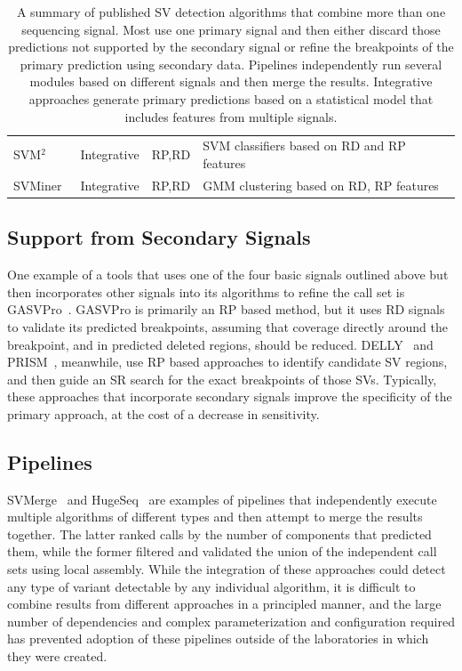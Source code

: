 \begin{table}
\begin{center}
{\begin{tabular}{llll}
SVM$^2$~\cite{Chiara:2012ey}    &       Integrative     &       RP,RD   &       SVM classifiers based on RD and RP features \\
SVMiner~\cite{Hayes:2012ia}	&	Integrative	&	RP,RD	&	GMM clustering based on RD, RP features	\\
\hline
\end{tabular}
}
\end{center}
\caption[A summary of published SV detection algorithms that combine more than one sequencing signal.]{A summary of published SV detection algorithms that combine more than one sequencing signal. Most use one primary signal and then either discard those predictions not supported by the secondary signal or refine the breakpoints of the primary prediction using secondary data. Pipelines independently run several modules based on different signals and then merge the results. Integrative approaches generate primary predictions based on a statistical model that includes features from multiple signals.}
\label{table_hybrid_sv_approaches}
\end{table}

\subsection{Support from Secondary Signals}

One example of a tools that uses one of the four basic signals outlined above but then incorporates other signals into its algorithms to refine the call set is GASVPro~\cite{Sindi:2012kk}. GASVPro is primarily an RP based method, but it uses RD signals to validate its predicted breakpoints, assuming that coverage directly around the breakpoint, and in predicted deleted regions, should be reduced. DELLY~\cite{Rausch:2012he} and PRISM~\cite{Jiang:2012cp}, meanwhile, use RP based approaches to identify candidate SV regions, and then guide an SR search for the exact breakpoints of those SVs. Typically, these approaches that incorporate secondary signals improve the specificity of the primary approach, at the cost of a decrease in sensitivity.
 
\subsection{Pipelines}

SVMerge~\cite{Wong:2010p1271} and HugeSeq~\cite{Lam:2012jy} are examples of pipelines that independently execute multiple algorithms of different types and then attempt to merge the results together. The latter ranked calls by the number of components that predicted them, while the former filtered and validated the union of the independent call sets using local assembly. While the integration of these approaches could detect any type of variant detectable by any individual algorithm, it is difficult to combine results from different approaches in a principled manner, and the large number of dependencies and complex parameterization and configuration required has prevented adoption of these pipelines outside of the laboratories in which they were created.

